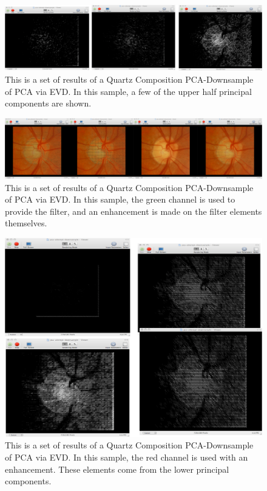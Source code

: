 \documentclass[11pt]{article}
\begin{document}
\begin{figure}[htbp] %
   \centering
   \includegraphics[width=5in]{lowerEyeRedChannel.pdf} 
   \caption{This is a set of results of a Quartz Composition PCA-Downsample of PCA via EVD.  In this sample, a few of the upper half principal components are shown.}
   \label{downsampled-pca-quartz-composer-lower-red-channel-eye}
\end{figure}


\begin{figure}[htbp] %
   \centering
   \includegraphics[width=5in]{eye-lower-green-channel-blended.pdf} 
   \caption{This is a set of results of a Quartz Composition PCA-Downsample of PCA via EVD.  In this sample, the green channel is used to provide the filter, and an enhancement is made on the filter elements themselves. }
   \label{downsampled-pca-quartz-composer-green-channel-blended}
\end{figure}


\begin{figure}[htbp] %
   \centering
   \includegraphics[width=5in]{red-channel-upper16.pdf} 
   \caption{This is a set of results of a Quartz Composition PCA-Downsample of PCA via EVD.  In this sample, the red channel is used with an enhancement.  These elements come from the lower principal components. }
   \label{downsampled-pca-quartz-composer-green-channel-blended}
\end{figure}
\end{document}
